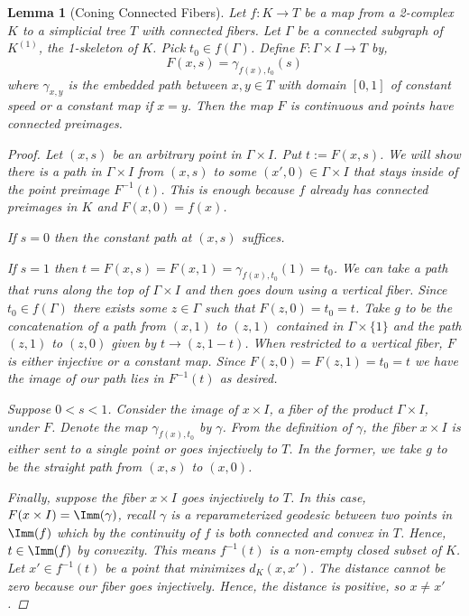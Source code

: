 \documentclass[12pt,parskip=full]{report}
\theoremstyle{plain}
\newtheorem{lem}[thm]{Lemma}
\theoremstyle{definition}
\begin{document}
\begin{lem}
    [Coning Connected Fibers]
    \label{lem:confib} 
     Let $f:K\to T$ be a map from a 2-complex $K$ to a simplicial tree $T$ with connected fibers. Let $\Gamma$ be a connected subgraph of $K^{(1)}$, the 1-skeleton of $K$. Pick $t_0\in f(\Gamma)$. Define $F:\Gamma\times I\to T$ by,
    \[ F(x,s) = 
            \gamma_{f(x),t_{0}} (s ) 
    \]
    where $\gamma_{x,y}$ is the embedded path between $x,y\in T$ with domain $[0,1]$ of constant speed or a constant map if $x=y$. Then the map $F$ is continuous and points have connected preimages.
    \begin{proof}
        Let $(x,s)$ be an arbitrary point in $\Gamma \times I$. Put $t:=F(x,s)$. We will show there is a path in $\Gamma\times I$ from $(x,s)$ to some $(x',0)\in \Gamma\times I$ that stays inside of the point preimage $F^{-1}(t)$. This is enough because $f$ already has connected preimages in $K$ and $F(x,0)=f(x)$.
        
        If $s=0$ then the constant path at $(x,s)$ suffices. 
        
        If $s=1$ then \(t=F(x,s)=F(x,1)=\gamma_{f(x),t_0}(1)=t_0\). We can take a path that runs along the top of $\Gamma\times I$ and then goes down using a vertical fiber. Since $t_0\in f(\Gamma)$ there exists some $z\in \Gamma$ such that $F(z,0)=t_0=t$. Take $g$ to be the concatenation of a path from $(x,1)$ to $(z,1)$ contained in $\Gamma\times \{1\}$ and the path $(z,1)$ to $(z,0)$ given by $t\to (z,1-t)$. When restricted to a vertical fiber, $F$ is either injective or a constant map. Since $F(z,0)=F(z,1)=t_0=t$ we have the image of our path lies in $F^{-1}(t)$ as desired.
        
        Suppose $0 < s < 1$. Consider the image of $x\times I$, a fiber of the product $\Gamma \times I$, under $F$. Denote the map $\gamma_{f(x),t_0}$ by $\gamma$. From the definition of $\gamma$, the fiber $x\times I$ is either sent to a single point or goes injectively to $T$. In the former, we take $g$ to be the straight path from $(x,s)$ to $(x,0)$.
        
        Finally, suppose the fiber $x\times I$ goes injectively to $T$. In this case, $F(x\times I) = \Imm(\gamma)$, recall $\gamma$ is a reparameterized geodesic between two points in $\Imm(f)$ which by the continuity of $f$ is both connected and convex in $T$. Hence, $t \in \Imm(f)$ by convexity. This means $f^{-1}(t)$ is a non-empty closed subset of $K$. Let $x'\in f^{-1}(t)$ be a point that minimizes $d_K(x,x')$. The distance cannot be zero because our fiber goes injectively. Hence, the distance is positive, so $x\neq x'$. 
        

\end{proof}
\end{lem}
\end{document}
